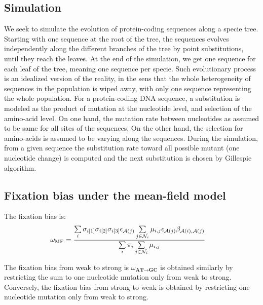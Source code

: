 \subsection{Simulation}
\label{sec-mut-bias:simu}
We seek to simulate the evolution of protein-coding sequences along a specie tree.
Starting with one sequence at the root of the tree, the sequences evolves independently along the different branches of the tree by point substitutions, until they reach the leaves.
At the end of the simulation, we get one sequence for each leaf of the tree, meaning one sequence per specie.
Such evolutionary process is an idealized version of the reality, in the sens that the whole heterogeneity of sequences in the population is wiped away, with only one sequence representing the whole population.
For a protein-coding \acrshort{DNA} sequence, a \gls{substitution} is modeled as the product of mutation at the nucleotide level, and selection of the amino-acid level.
On one hand, the mutation rate between nucleotides as assumed to be same for all sites of the sequences.
On the other hand, the selection for amino-acids is assumed to be varying along the sequences.
During the simulation, from a given sequence the substitution rate toward all possible mutant (one nucleotide change) is computed and the next substitution is chosen by Gillespie algorithm.

\subsection{Fixation bias under the mean-field model}
\label{sec-mut-bias:mean-field-omega}

The fixation bias is:
\begin{align}
    \omega_{\text{MF}} & = \dfrac{ \sum\limits_{i} \sigma_{{i}[1]}\sigma_{{i}[2]}\sigma_{{i}[3]} \epsilon_{\mathcal{A}({j})} \sum\limits_{j \in \mathcal{N}_{{i}}} \mu_{{i}, {j}} \epsilon_{\mathcal{A}({j})} \beta_{\mathcal{A}({i}), \mathcal{A}({j})} }{\sum\limits_{i} \pi_{i} \sum\limits_{j \in \mathcal{N}_{{i}} } \mu_{{i}, {j}}}
\end{align}

The fixation bias from weak to strong is $\omega_{\textbf{AT} \rightarrow \textbf{GC}}$ is obtained similarly by restricting the sum to one nucleotide mutation only from weak to strong.
Conversely, the fixation bias from strong to weak is obtained by restricting one nucleotide mutation only from weak to strong.